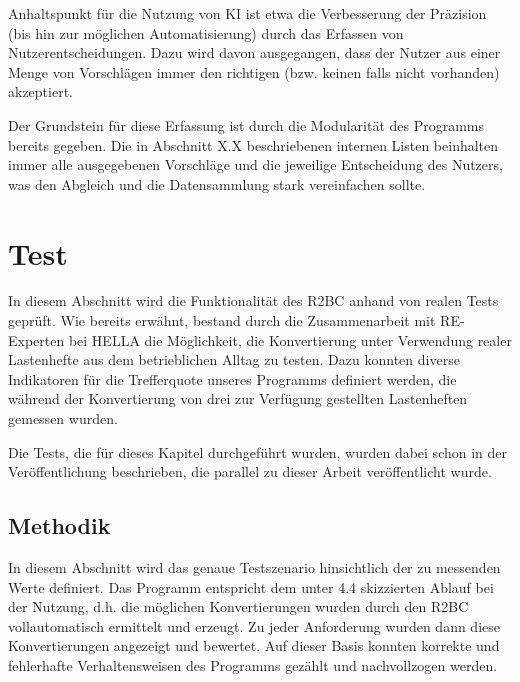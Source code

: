 \documentclass[12pt]{report}
\begin{document}
Anhaltspunkt für die Nutzung von KI ist etwa die Verbesserung der Präzision (bis hin zur möglichen Automatisierung) durch das Erfassen von Nutzerentscheidungen. Dazu wird davon ausgegangen, dass der Nutzer aus einer Menge von Vorschlägen immer den richtigen (bzw. keinen falls nicht vorhanden) akzeptiert. 

Der Grundstein für diese Erfassung ist durch die Modularität des Programms bereits gegeben. Die in Abschnitt X.X beschriebenen internen Listen beinhalten immer alle ausgegebenen Vorschläge und die jeweilige Entscheidung des Nutzers, was den Abgleich und die Datensammlung stark vereinfachen sollte. 

\section{Test}
In diesem Abschnitt wird die Funktionalität des R2BC anhand von realen Tests geprüft. Wie bereits erwähnt, bestand durch die Zusammenarbeit mit RE-Experten bei HELLA die Möglichkeit, die Konvertierung unter Verwendung realer Lastenhefte aus dem betrieblichen Alltag zu testen. Dazu konnten diverse Indikatoren für die Trefferquote unseres Programms definiert werden, die während der Konvertierung von drei zur Verfügung gestellten Lastenheften gemessen wurden.

Die Tests, die für dieses Kapitel durchgeführt wurden, wurden dabei schon in der Veröffentlichung \cite{zh19} beschrieben, die parallel zu dieser Arbeit veröffentlicht wurde.

\subsection{Methodik}
In diesem Abschnitt wird das genaue Testszenario hinsichtlich der zu messenden Werte definiert. Das Programm entspricht dem unter 4.4 skizzierten Ablauf bei der Nutzung, d.h. die möglichen Konvertierungen wurden durch den R2BC vollautomatisch ermittelt und erzeugt. Zu jeder Anforderung wurden dann diese Konvertierungen angezeigt und bewertet. Auf dieser Basis konnten korrekte und fehlerhafte Verhaltensweisen des Programms gezählt und nachvollzogen werden.
\end{document}
